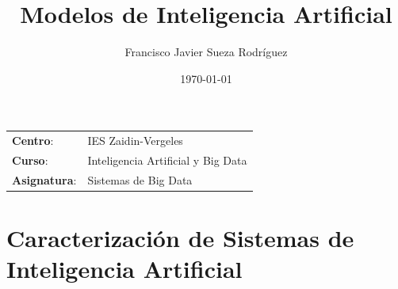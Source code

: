 


\title{
\vspace{10ex}
\normalfont \normalsize
\huge \textbf{Modelos de Inteligencia Artificial}
}
\author{Francisco Javier Sueza Rodríguez}
\date{\normalsize\today}

\glsenablehyper
\makeglossaries
{}




\maketitle

\thispagestyle{empty}

\vspace{75ex}

\begin{center}
    \begin{tabular}{l l}
        \textbf{Centro}: & IES Zaidin-Vergeles \\
        \textbf{Curso}: & Inteligencia Artificial y Big Data\\
        \textbf{Asignatura}: & Sistemas de Big Data\
    \end{tabular}
\end{center}

\newpage

\begingroup
\hypersetup{linkcolor=black}
\tableofcontents
\endgroup

\newpage

\begingroup
\hypersetup{linkcolor=black}
\listoffigures
\listoftables
\endgroup

\newpage

\section{Caracterización de Sistemas de Inteligencia Artificial}


\newpage
 
\printglossary	

\newpage





 